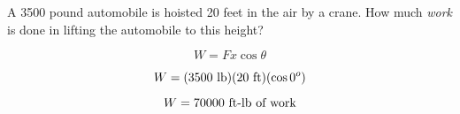 

A 3500 pound automobile is hoisted 20 feet in the air by a crane.  How much {\it work} is done in lifting the automobile to this height?







$$W = F x \cos \theta$$

$$W = (3500 \hbox{ lb}) (20 \hbox{ ft}) (\cos 0^o)$$

$$W = 70000 \hbox{ ft-lb of work}$$











